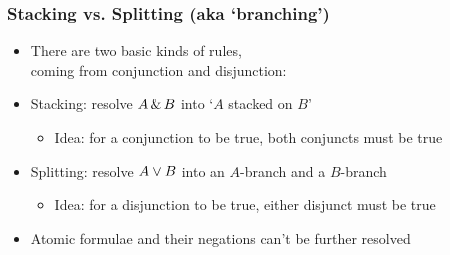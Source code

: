 \begin{frame}
\frametitle{Stacking vs. Splitting (aka `branching')}

\begin{itemize}[<+->]

\item There are two basic kinds of rules, \\ coming from conjunction and disjunction:

\item Stacking: resolve $A \,\&\, B$ into `$A$ stacked on $B$'

\begin{itemize}

\item Idea: for a conjunction to be true, both conjuncts must be true  

\end{itemize}

\bigskip

\item Splitting: resolve $A \vee B$ into an $A$-branch and a $B$-branch

\begin{itemize}

\item Idea: for a disjunction to be true, either disjunct must be true

\end{itemize}

\bigskip 

\item Atomic formulae and their negations can't be further resolved 


\end{itemize}
\end{frame}


